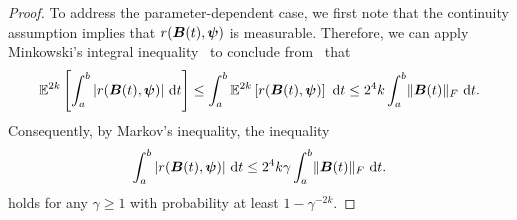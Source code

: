 \begin{proof}
    To address the parameter-dependent case, we first note that the continuity assumption implies that $r(\boldsymbol{B}(t), \boldsymbol{\psi})$ is measurable. Therefore, we can apply Minkowski's integral inequality~\cite[Theorem 202]{hardy-1952-inequalities} to conclude from~ that
    \begin{equation}
        \mathbb{E}^{2 k}\left[ \int_{a}^{b} |r(\boldsymbol{B}(t), \boldsymbol{\psi})|~\mathrm{d}t  \right]
        \leq \int_{a}^{b} \mathbb{E}^{2 k}\left[ r(\boldsymbol{B}(t), \boldsymbol{\psi}) \right]~\mathrm{d}t
        \leq 2^4 k \int_{a}^{b} \lVert \boldsymbol{B}(t) \rVert _F~\mathrm{d}t.
    \end{equation}
    Consequently, by Markov's inequality,  the inequality 
    \begin{equation} 
        \int_{a}^{b} |r(\boldsymbol{B}(t), \boldsymbol{\psi})|~\mathrm{d}t \leq 2^4 k \gamma \int_{a}^{b} \lVert \boldsymbol{B}(t) \rVert _F~\mathrm{d}t.
        \label{equ:hutchinson-trace-onequery-uniform}
    \end{equation}
    holds for any $\gamma \geq 1$ with probability at least $1 - \gamma^{-2 k}$. 


\end{proof}
